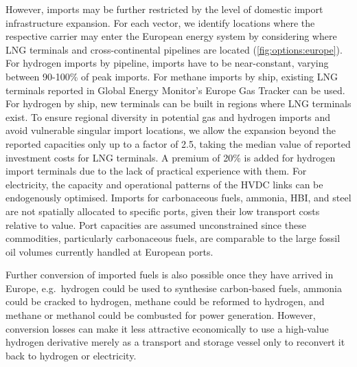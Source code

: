 However, imports may be further restricted by the level of domestic import
infrastructure expansion. For each vector, we identify locations where the
respective carrier may enter the European energy system by considering where LNG
terminals and cross-continental pipelines are located
(\cref{fig:options:europe}). For hydrogen imports by pipeline, imports have to
be near-constant, varying between 90-100\% of peak imports. For methane imports
by ship, existing LNG terminals reported in Global Energy Monitor's Europe Gas
Tracker\cite{globalenergymonitorEuropeGasTracker2024} can be used. For hydrogen
by ship, new terminals can be built in regions where LNG terminals exist. To
ensure regional diversity in potential gas and hydrogen imports and avoid
vulnerable singular import locations, we allow the expansion beyond the reported
capacities only up to a factor of 2.5, taking the median value of reported
investment costs for LNG terminals.\cite{GlobalGas2022} A premium of 20\% is
added for hydrogen import terminals due to the lack of practical experience with
them. For electricity, the capacity and operational patterns of the HVDC links
can be endogenously optimised. Imports for carbonaceous fuels, ammonia, HBI, and
steel are not spatially allocated to specific ports, given their low transport
costs relative to value. Port capacities are assumed unconstrained since these
commodities, particularly carbonaceous fuels, are comparable to the large fossil
oil volumes currently handled at European ports.


Further conversion of imported fuels is also possible once they have arrived in
Europe, e.g.~hydrogen could be used to synthesise carbon-based fuels, ammonia
could be cracked to hydrogen, methane could be reformed to hydrogen, and methane
or methanol could be combusted for power generation. However, conversion losses
can make it less attractive economically to use a high-value hydrogen derivative
merely as a transport and storage vessel only to reconvert it back to hydrogen
or electricity.


